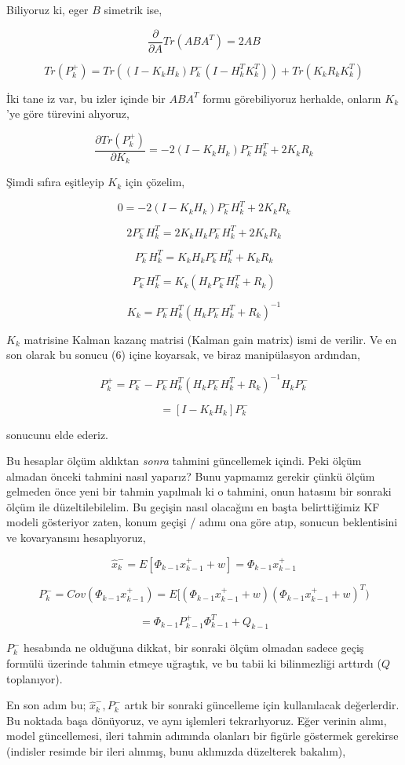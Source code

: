 \documentclass[12pt,fleqn]{article}\usepackage{../../common}
\begin{document}
Biliyoruz ki, eger $B$ simetrik ise,

$$ \frac{\partial }{\partial A} Tr(ABA^T) = 2AB $$

$$ Tr(P_k^{+}) =  Tr((I - K_kH_k)P_k^-(I - H_k^TK_k^T)) + Tr(K_kR_kK_k^T) $$

İki tane iz var, bu izler içinde bir $ABA^T$ formu görebiliyoruz herhalde,
onların $K_k$'ye göre türevini alıyoruz,

$$ 
\frac{\partial Tr(P_k^{+})}{\partial K_k}  =
-2(I - K_kH_k)P_k^- H_k^T + 2K_kR_k
$$

Şimdi sıfıra eşitleyip $K_k$ için çözelim,

$$ 0 = -2(I - K_kH_k)P_k^- H_k^T + 2K_kR_k $$

$$  2P_k^- H_k^T = 2K_kH_kP_k^- H_k^T + 2K_kR_k $$

$$  P_k^- H_k^T = K_kH_kP_k^- H_k^T + K_kR_k  $$

$$  P_k^- H_k^T = K_k(H_kP_k^- H_k^T + R_k)  $$

$$  K_k = P_k^- H_k^T(H_kP_k^- H_k^T + R_k)^{-1} $$

$K_k$ matrisine Kalman kazanç matrisi (Kalman gain matrix) ismi de verilir. Ve
en son olarak bu sonucu (6) içine koyarsak, ve biraz manipülasyon ardından,

$$ P_k^+ = P_k^- -P_k^- H_k^T (H_kP_k^- H_k^T + R_k)^{-1}H_kP_k^-  $$

$$ = [I - K_kH_k]P_k^-  $$

sonucunu elde ederiz. 

Bu hesaplar ölçüm aldıktan {\em sonra} tahmini güncellemek içindi. Peki ölçüm
almadan önceki tahmini nasıl yaparız? Bunu yapmamız gerekir çünkü ölçüm gelmeden
önce yeni bir tahmin yapılmalı ki o tahmini, onun hatasını bir sonraki ölçüm ile
düzeltilebilelim. Bu geçişin nasıl olacağını en başta belirttiğimiz KF modeli
gösteriyor zaten, konum geçişi / adımı ona göre atıp, sonucun beklentisini ve
kovaryansını hesaplıyoruz,

$$ \hat{x}_k^- = E[\Phi_{k-1}x_{k-1}^+ + w] = \Phi_{k-1}x_{k-1}^+ $$

$$ P_k^- = Cov(\Phi_{k-1}x_{k-1}^+) = E[(\Phi_{k-1}x_{k-1}^+ + w)(\Phi_{k-1}x_{k-1}^+ + w)^T) $$

$$ =  \Phi_{k-1}P_{k-1}^+\Phi_{k-1}^T + Q_{k-1}  $$

$P_k^-$ hesabında ne olduğuna dikkat, bir sonraki ölçüm olmadan sadece geçiş
  formülü üzerinde tahmin etmeye uğraştık, ve bu tabii ki bilinmezliği arttırdı
  ($Q$ toplanıyor).

En son adım bu; $\hat{x}_k^-,P_k^-$ artık bir sonraki güncelleme için
kullanılacak değerlerdir. Bu noktada başa dönüyoruz, ve aynı işlemleri
tekrarlıyoruz. Eğer verinin alımı, model güncellemesi, ileri tahmin adımında
olanları bir figürle göstermek gerekirse (indisler resimde bir ileri alınmış,
bunu aklımızda düzelterek bakalım),
\end{document}
